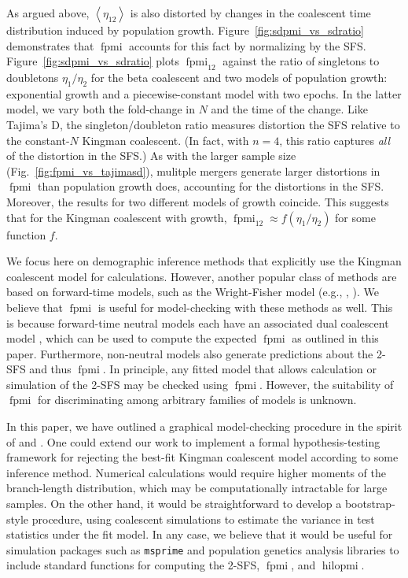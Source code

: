 \documentclass[11pt, letterpaper]{article}   	%
\newcommand{\fig}[1]{Fig.~\ref{#1}}
\newcommand{\Fig}[1]{Figure~\ref{#1}}
\newcommand{\E}[1]{\left< #1 \right>}
\DeclareMathOperator{\fpmi}{fpmi}
\DeclareMathOperator{\hilopmi}{hilopmi}
\begin{document}
As argued above, $\E{\eta_{12}}$ is also distorted by changes in the coalescent time distribution induced by population growth.
\Fig{fig:sdpmi_vs_sdratio} demonstrates that $\fpmi$ accounts for this fact by normalizing by the SFS.
\Fig{fig:sdpmi_vs_sdratio} plots $\fpmi_{12}$ against the ratio of singletons to doubletons $\eta_1 / \eta_2$ for the beta coalescent and two models of population growth: exponential growth and a piecewise-constant model with two epochs.
In the latter model, we vary both the fold-change in $N$ and the time of the change.
Like Tajima's D, the singleton/doubleton ratio measures distortion the SFS relative to the constant-$N$ Kingman coalescent.
(In fact, with $n=4$, this ratio captures \emph{all} of the distortion in the SFS.)
As with the larger sample size (\fig{fig:fpmi_vs_tajimasd}), mulitple mergers generate larger distortions in $\fpmi$ than population growth does, accounting for the distortions in the SFS.
Moreover, the results for two different models of growth coincide.
This suggests that for the Kingman coalescent with growth, $\fpmi_{12} \approx f(\eta_1/\eta_2)$ for some function $f$.

We focus here on demographic inference methods that explicitly use the Kingman coalescent model for calculations.
However, another popular class of methods are based on forward-time models, such as the Wright-Fisher model (e.g., \cite{GutenkunstEtAl2009}, \cite{dical}).
We believe that $\fpmi$ is useful for model-checking with these methods as well.
This is because forward-time neutral models each have an associated dual coalescent model \cite{etheridge}, which can be used to compute the expected $\fpmi$ as outlined in this paper.
Furthermore, non-neutral models also generate predictions about the 2-SFS and thus $\fpmi$.
In principle, any fitted model that allows calculation or simulation of the 2-SFS may be checked using $\fpmi$.
However, the suitability of $\fpmi$ for discriminating among arbitrary families of models is unknown.

In this paper, we have outlined a graphical model-checking procedure in the spirit of \cite{Anscombe} and \cite{GelmanBDA}.
One could extend our work to implement a formal hypothesis-testing framework for rejecting the best-fit Kingman coalescent model according to some inference method.
Numerical calculations would require higher moments of the branch-length distribution, which may be computationally intractable for large samples.
On the other hand, it would be straightforward to develop a bootstrap-style procedure, using coalescent simulations to estimate the variance in test statistics under the fit model.
In any case, we believe that it would be useful for simulation packages such as \texttt{msprime} and population genetics analysis libraries to include standard functions for computing the 2-SFS, $\fpmi$, and $\hilopmi$.
\end{document}
